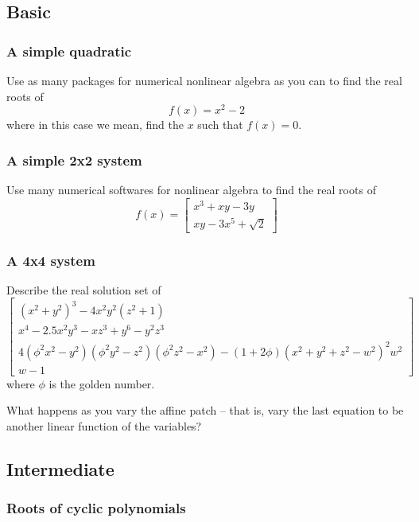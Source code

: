 \documentclass[letter,portrait]{article}
\newcommand{\1}{{\tt \_1}}
\newcommand{\2}{{\tt \_2}}
\begin{document}
\subsection{Basic}

\subsubsection{A simple quadratic}
\label{sec:1x1}

Use as many packages for numerical nonlinear algebra as you can to find the real roots of
\[
f(x) = 
x^2-2
\]
where in this case we mean, find the $x$ such that $f(x) = 0$.  


\subsubsection{A simple 2x2 system}
\label{sec:2x2}


Use many numerical softwares for nonlinear algebra to find the real roots of
\[
f(x) = \begin{bmatrix}
x^3 + xy - 3y \\ 
xy - 3x^5 + \sqrt{2}
\end{bmatrix}
\]

\subsubsection{A 4x4 system}
\label{sec:3x3}

Describe the real solution set of
\marginnote{}
\[
\begin{bmatrix}
(x^2+y^2)^3-4x^2y^2(z^2+1) \\ %
x^4-2.5x^2y^3 -xz^3 +y^6 -y^2z^3 \\ %
4(\phi^2x^2-y^2)(\phi^2y^2-z^2)(\phi^2z^2-x^2) - (1+2\phi)(x^2+y^2+z^2-w^2)^2w^2 \\ %
w-1
\end{bmatrix}
\]
where $\phi$ is the golden number.

What happens as you vary the affine patch -- that is, vary the last equation to be another linear function of the variables?




\subsection{Intermediate}

\subsubsection{Roots of cyclic polynomials}
\label{sec:cyclic}
\end{document}
